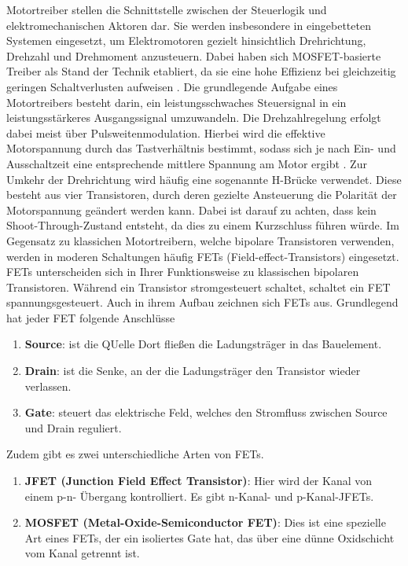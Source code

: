 Motortreiber stellen die Schnittstelle zwischen der Steuerlogik und elektromechanischen Aktoren dar. Sie werden insbesondere in eingebetteten Systemen eingesetzt, um Elektromotoren gezielt hinsichtlich Drehrichtung, Drehzahl und Drehmoment anzusteuern. Dabei haben sich MOSFET-basierte Treiber als Stand der Technik etabliert, da sie eine hohe Effizienz bei gleichzeitig geringen Schaltverlusten aufweisen \cite{Bartlett:2023a}.
Die grundlegende Aufgabe eines Motortreibers besteht darin, ein leistungsschwaches Steuersignal in ein leistungsstärkeres Ausgangssignal umzuwandeln. Die Drehzahlregelung erfolgt dabei meist über Pulsweitenmodulation. Hierbei wird die effektive Motorspannung durch das Tastverhältnis bestimmt, sodass sich je nach Ein- und Ausschaltzeit eine entsprechende mittlere Spannung am Motor ergibt \cite{Bartlett:2023a}.
Zur Umkehr der Drehrichtung wird häufig eine sogenannte H-Brücke verwendet. Diese besteht aus vier Transistoren, durch deren gezielte Ansteuerung die Polarität der Motorspannung geändert werden kann. Dabei ist darauf zu achten, dass kein Shoot-Through-Zustand entsteht, da dies zu einem Kurzschluss führen würde.
Im Gegensatz zu klassichen Motortreibern, welche bipolare Transistoren verwenden, werden in moderen Schaltungen häufig FETs (Field-effect-Transistors) eingesetzt. FETs unterscheiden sich in Ihrer Funktionsweise zu klassischen bipolaren Transistoren.  Während ein Transistor stromgesteuert schaltet, schaltet ein FET spannungsgesteuert. 
Auch in ihrem Aufbau zeichnen sich FETs aus. Grundlegend  hat jeder FET folgende Anschlüsse
\begin{center}
	\begin{enumerate}
		\item \textbf{Source}: ist die  \glqq QUelle \grqq \space Dort fließen die Ladungsträger in
		das Bauelement. 
		\item \textbf{Drain}:  ist die Senke, an der die Ladungsträger den Transistor wieder
		verlassen. 
		\item \textbf{Gate}: steuert das elektrische Feld, welches den Stromfluss zwischen
		Source und Drain reguliert.
	\end{enumerate}
\end{center} 

Zudem gibt es zwei unterschiedliche Arten von FETs. 
\begin{center}
	\begin{enumerate}
		\item  \textbf{ JFET (Junction Field Effect Transistor)}: Hier wird der Kanal von einem p-n-
		Übergang kontrolliert. Es gibt n-Kanal- und p-Kanal-JFETs.
		\item  \textbf{ MOSFET (Metal-Oxide-Semiconductor FET)}: Dies ist eine spezielle Art eines
		FETs, der ein isoliertes Gate hat, das über eine dünne Oxidschicht vom Kanal
		getrennt ist.
	\end{enumerate}
\end{center}

